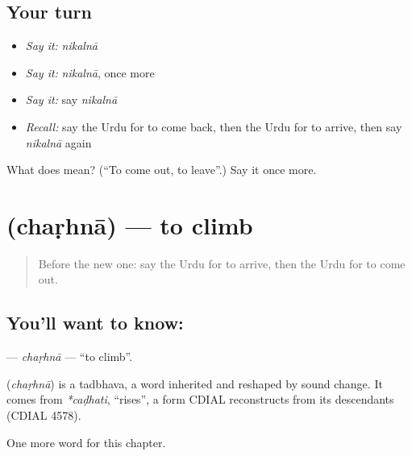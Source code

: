 \subsection*{Your turn}
\begin{itemize}
\raggedright
  \item \emph{Say it:} \emph{nikalnā}
  \item \emph{Say it:} \emph{nikalnā}, once more
  \item \emph{Say it:} say \emph{nikalnā}
  \item \emph{Recall:} say the Urdu for to come back, then the Urdu for to arrive, then say \emph{nikalnā} again
\end{itemize}

\begin{tcolorbox}[breakable,colback=teal!4,colframe=teal!35!black,title={Before you move on}]
What does  mean? (\textquotedblleft{}To come out, to leave\textquotedblright{}.) Say it once more.
\end{tcolorbox}
\section[\texorpdfstring{\ur{چڑھنا} (chaṛhnā)}{چڑھنا (chaṛhnā)}]{ (chaṛhnā) — to climb}

\label{lesson:UR-C141-charhna}



\begin{quote}
Before the new one: say the Urdu for to arrive, then the Urdu for to come out.
\end{quote}

\subsection*{You'll want to know: }
\textbf{} — \emph{chaṛhnā} — \textquotedblleft{}to climb\textquotedblright{}.

\begin{cousinweb}
\textbf{} (\emph{chaṛhnā}) is a tadbhava, a word inherited and reshaped by sound change. It comes from \emph{*caḍhati}, \textquotedblleft{}rises\textquotedblright{}, a form CDIAL reconstructs from its descendants (CDIAL 4578).
\end{cousinweb}

\begin{grammarlens}[title={What you've built}]
One more word for this chapter.
\end{grammarlens}

